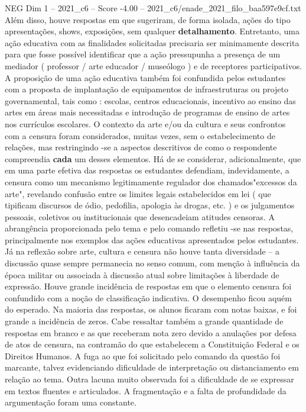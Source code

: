 \begin{textsample}{NEG Dim 1 – 2021\_c6 – Score -4.00 – 2021\_c6/enade\_2021\_filo\_baa597e9cf.txt}
Além disso, houve respostas em que sugeriram, de forma isolada, ações do tipo apresentações, shows, exposições, sem qualquer \textbf{detalhamento}.
Entretanto, uma ação educativa com as finalidades solicitadas precisaria ser minimamente descrita para que fosse possível identificar que a ação pressupunha a presença de um mediador ( professor / arte educador / museólogo ) e de receptores participativos.
A proposição de uma ação educativa também foi confundida pelos estudantes com a proposta de implantação de equipamentos de infraestruturas ou projeto governamental, tais como : escolas, centros educacionais, incentivo ao ensino das artes em áreas mais necessitadas e introdução de programas de ensino de artes nos currículos escolares.
O contexto da arte e/ou da cultura e seus confrontos com a censura foram considerados, muitas vezes, sem o estabelecimento de relações, mas restringindo -se a aspectos descritivos de como o respondente compreendia \textbf{cada} um desses elementos.
Há de se considerar, adicionalmente, que em uma parte efetiva das respostas os estudantes defendiam, indevidamente, a censura como um mecanismo legitimamente regulador dos chamados"excessos da arte", revelando confusão entre os limites legais estabelecidos em lei ( que tipificam discursos de ódio, pedofilia, apologia às drogas, etc. ) e os julgamentos pessoais, coletivos ou institucionais que desencadeiam atitudes censoras.
A abrangência proporcionada pelo tema e pelo comando refletiu -se nas respostas, principalmente nos exemplos das ações educativas apresentados pelos estudantes.
Já na reflexão sobre arte, cultura e censura não houve tanta diversidade – a discussão quase sempre permanecia no senso comum, com menção à influência da época militar ou associada à discussão atual sobre limitações à liberdade de expressão.
Houve grande incidência de respostas em que o elemento censura foi confundido com a noção de classificação indicativa.
O desempenho ficou aquém do esperado.
Na maioria das respostas, os alunos ficaram com notas baixas, e foi grande a incidência de zeros.
Cabe ressaltar também a grande quantidade de respostas em branco e as que receberam nota zero devido a anulações por defesa de atos de censura, na contramão do que estabelecem a Constituição Federal e os Direitos Humanos.
A fuga ao que foi solicitado pelo comando da questão foi marcante, talvez evidenciando dificuldade de interpretação ou distanciamento em relação ao tema.
Outra lacuna muito observada foi a dificuldade de se expressar em textos fluentes e articulados.
A fragmentação e a falta de profundidade da argumentação foram uma constante.

\end{textsample}
